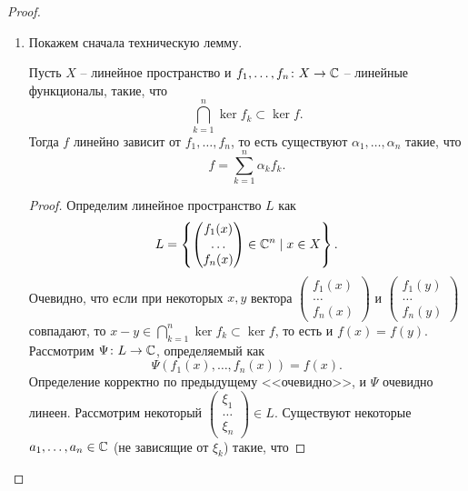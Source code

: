 \begin{proof}
\begin{enumerate}
        Вложение $\tau_{w*} \subset (\tau_{w})^*$ очевидно, так как $\tau_{w*}$ -- слабая топология, порождённая $\Phi(X)$, а $(\tau_w)^*$ порождается всем $X^{**}$, очевидно содержащим $\Phi(X)$.
        Равенство достигается в случае если $\Phi(X) = X^{**}$, то есть если $X$ -- рефлексивно, то $\tau_{w^*} = (\tau_w)^*$.
        \item Покажем сначала техническую лемму.
        \begin{lemma}[О ядрах]
            Пусть $X$ -- линейное пространство и $f_1, \ldots, f_n\colon X \to \mathbb{C}$ -- линейные функционалы, такие, что
            \[
                \bigcap_{k = 1}^{n} \ker f_k \subset \ker f.
            \]
            Тогда $f$ линейно зависит от $f_1, \ldots, f_n$, то есть существуют $\alpha_1, \ldots, \alpha_n$ такие, что
            \[
                f = \sum_{k = 1}^{n} \alpha_k f_k.
            \]
        \end{lemma}
        \begin{proof}
            Определим линейное пространство $L$ как
            \[
                L = \left\{\begin{pmatrix*} f_1(x) \\ \ldots \\ f_n(x)
                \end{pmatrix*} \in \Cm^n \mid x \in X\right\}.
            \]
            Очевидно, что если при некоторых $x, y$ вектора $\begin{pmatrix*} f_1(x) \\ \ldots \\ f_n(x)
            \end{pmatrix*}$ и $\begin{pmatrix*} f_1(y) \\ \ldots \\ f_n(y)
            \end{pmatrix*}$ совпадают, то $x - y \in \bigcap_{k = 1}^{n} \ker f_k \subset \ker f$, то есть и $f(x) = f(y)$.
            Рассмотрим $\Psi\colon L \to \mathbb{C}$, определяемый как
            \[
                \Psi(f_1(x), \ldots, f_n(x)) = f(x).
            \]
            Определение корректно по предыдущему <<очевидно>>, и $\Psi$ очевидно линеен.
            Рассмотрим некоторый $\begin{pmatrix*} \xi_1 \\ \ldots \\ \xi_n
            \end{pmatrix*} \in L$.
            Существуют некоторые $a_1, \ldots, a_n \in \mathbb{C}$ (не зависящие от $\xi_k$) такие, что

\end{proof}
\end{enumerate}
\end{proof}

